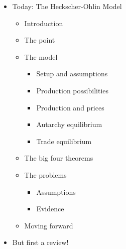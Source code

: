 \documentclass[ignorenonframetext,]{beamer}
\begin{document}
\begin{frame}
\begin{itemize}
\itemsep1pt\parskip0pt
\item
  Today: The Heckscher-Ohlin Model
  \begin{itemize}
        \item Introduction
        \item The point
        \item The model
        \begin{itemize}
            \item Setup and assumptions
            \item Production possibilities
            \item Production and prices
            \item Autarchy equilibrium
            \item Trade equilibrium
        \end{itemize}
        \item The big four theorems
        \item The problems 
        \begin{itemize}
            \item Assumptions
            \item Evidence
        \end{itemize}
        \item Moving forward
    \end{itemize}
\end{itemize}

\end{frame}

\begin{frame}
    \begin{itemize}
        \item But first a review!
    \end{itemize}
\end{frame}
\end{document}
